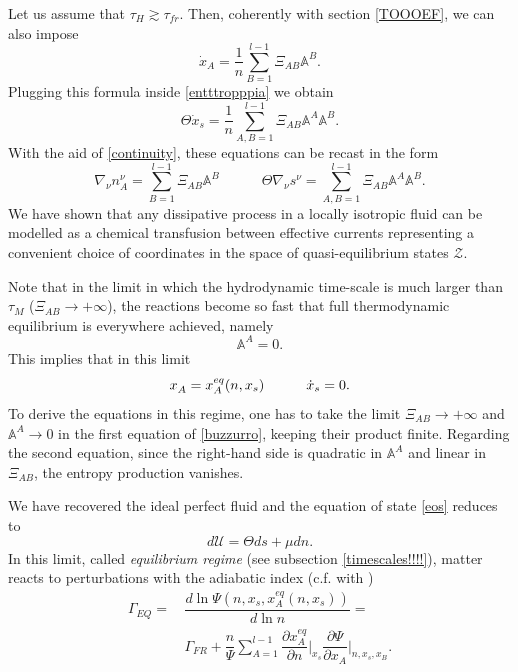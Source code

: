 \documentclass[useAMS,usenatbib,prd,twocolumn,nofootinbib]{revtex4-1}
\newcommand{\spc}{\quad \quad \quad}
\begin{document}
Let us assume that $\tau_H \gtrsim \tau_{fr}$. Then, coherently with section \ref{TOOOEF}, we can also impose
\begin{equation}\label{strongG}
\dot{x}_A = \dfrac{1}{n} \sum_{B=1}^{l-1} \Xi_{AB} \mathbb{A}^B.
\end{equation}
Plugging this formula inside \eqref{entttropppia} we obtain
\begin{equation}\label{entropyprodfluid}
\Theta \dot{x}_s =\dfrac{1}{n} \sum_{A,B=1}^{l-1} \Xi_{AB} \mathbb{A}^A \mathbb{A}^B .
\end{equation}
With the aid of \eqref{continuity}, these equations can be recast in the form
\begin{equation}\label{buzzurro}
 \nabla_\nu n_A^\nu = \sum_{B=1}^{l-1} \Xi_{AB} \mathbb{A}^B \spc \Theta \nabla_\nu s^\nu =  \sum_{A,B=1}^{l-1} \Xi_{AB} \mathbb{A}^A \mathbb{A}^B . 
\end{equation}
We have shown that any dissipative process in a locally isotropic fluid can be modelled as a chemical transfusion between effective currents representing a convenient choice of coordinates in the space of quasi-equilibrium states $\mathcal{Z}$. 

Note that in the limit in which the hydrodynamic time-scale is much larger than $\tau_M$ ($\Xi_{AB} \longrightarrow + \infty$), the reactions become so fast that full thermodynamic equilibrium is everywhere achieved, namely
\begin{equation}
\mathbb{A}^A =0.
\end{equation}
This implies that in this limit
\begin{equation}
x\indices{_A} = x_A^{eq}(n,x_s)  \spc  \dot{x}_s =0.
\end{equation}
To derive the equations in this regime, one has to take the limit $\Xi_{AB} \longrightarrow + \infty$ and $\mathbb{A}^A \longrightarrow 0$ in the first equation of \eqref{buzzurro}, keeping their product finite. Regarding the second equation, since the right-hand side is quadratic in $\mathbb{A}^A$ and linear in $\Xi_{AB}$, the entropy production vanishes.

We have recovered the ideal perfect fluid and the equation of state \eqref{eos} reduces to
\begin{equation}
d\mathcal{U} = \Theta ds + \mu dn.
\end{equation}
In this limit, called \textit{equilibrium regime} (see subsection \ref{timescales!!!!}), matter reacts to perturbations with the adiabatic index (c.f. with \cite{haensel_frozen})
\begin{equation}
\begin{split}
\Gamma_{EQ}  = \, & \dfrac{d \ln \Psi (n,x_s , x_A^{eq}(n,x_s))}{d \ln n}  = \\ & \Gamma_{FR} + \dfrac{n}{\Psi} \sum_{A=1}^{l-1} \dfrac{\partial x_A^{eq}}{\partial n}\bigg|_{x_s} \dfrac{\partial \Psi}{\partial x_A} \bigg|_{n,x_s,x_B} . \\
\end{split}
\end{equation}
\end{document}

